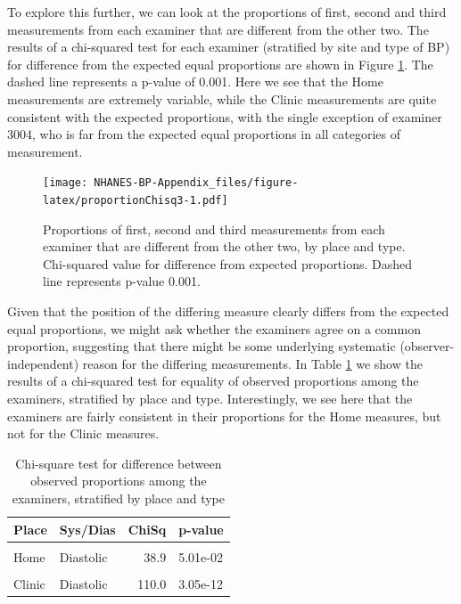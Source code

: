 \documentclass[
]{article}
\begin{document}
To explore this further, we can look at the proportions of first, second and third measurements from each examiner that are different from the other two.
The results of a chi-squared test for each examiner (stratified by site and type of BP) for difference from the expected equal proportions are shown in Figure \ref{fig:proportionChisq3}.
The dashed line represents a p-value of 0.001.
Here we see that the Home measurements are extremely variable, while the Clinic measurements are quite consistent with the expected proportions, with the single exception of examiner 3004, who is far from the expected equal proportions in all categories of measurement.

\begin{figure}
\centering
\texttt{[image: NHANES-BP-Appendix\_files/figure-latex/proportionChisq3-1.pdf]}
\caption{\label{fig:proportionChisq3}Proportions of first, second and third measurements from each examiner that are different from the other two, by place and type. Chi-squared value for difference from expected proportions. Dashed line represents p-value 0.001.}
\end{figure}

Given that the position of the differing measure clearly differs from the expected equal proportions, we might ask whether the examiners agree on a common proportion, suggesting that there might be some underlying systematic (observer-independent) reason for the differing measurements.
In Table \ref{tab:ternaryChi2} we show the results of a chi-squared test for equality of observed proportions among the examiners, stratified by place and type.
Interestingly, we see here that the examiners are fairly consistent in their proportions for the Home measures, but not for the Clinic measures.

\begin{table}[!h]
\centering
\caption{\label{tab:ternaryChi2}Chi-square test for difference between observed proportions among the examiners, stratified by place and type}
\centering
\begin{tabular}[t]{llrl}
\toprule
Place & Sys/Dias & ChiSq & p-value\\
\midrule
\cellcolor{gray!10}{Home} & \cellcolor{gray!10}{Systolic} & \cellcolor{gray!10}{32.8} & \cellcolor{gray!10}{1.69e-01}\\
Home & Diastolic & 38.9 & 5.01e-02\\
\cellcolor{gray!10}{Clinic} & \cellcolor{gray!10}{Systolic} & \cellcolor{gray!10}{60.0} & \cellcolor{gray!10}{1.67e-04}\\
Clinic & Diastolic & 110.0 & 3.05e-12\\
\bottomrule
\end{tabular}
\end{table}
\end{document}
